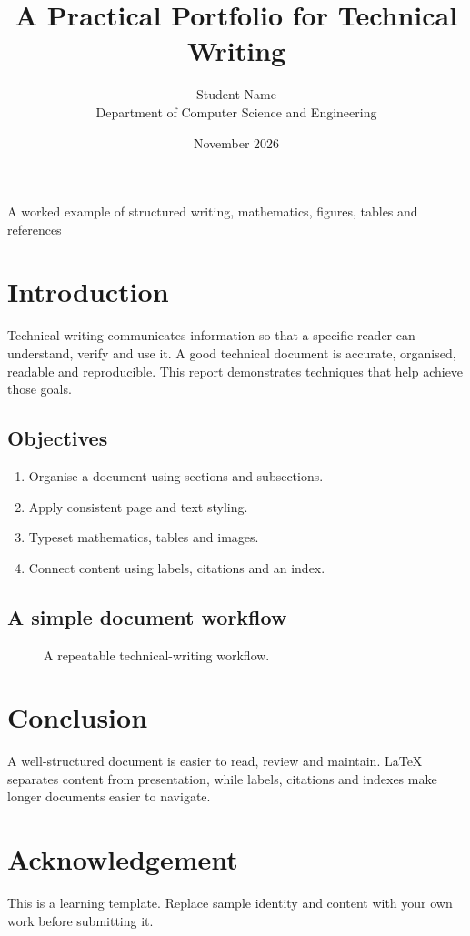 \documentclass[11pt,a4paper]{article}
\title{A Practical Portfolio for Technical Writing}
\author{Student Name \\ Department of Computer Science and Engineering}
\date{November 2026}
\begin{document}
\maketitle
\begin{center}\color{Muted}\small A worked example of structured writing, mathematics, figures, tables and references\end{center}
\tableofcontents
\listoffigures
\listoftables
\newpage
\section{Introduction}\label{sec:introduction}
Technical writing communicates information so that a specific reader can understand, verify and use it. A good technical document is accurate, organised, readable and reproducible. This report demonstrates techniques that help achieve those goals.
\subsection{Objectives}
\begin{enumerate}
\item Organise a document using sections and subsections.
\item Apply consistent page and text styling.
\item Typeset mathematics, tables and images.
\item Connect content using labels, citations and an index.
\end{enumerate}
\subsection{A simple document workflow}
\begin{figure}[H]\centering
{}
\caption{A repeatable technical-writing workflow.}\label{fig:workflow}
\end{figure}



\section{Conclusion}\label{sec:conclusion}
A well-structured document is easier to read, review and maintain. LaTeX separates content from presentation, while labels, citations and indexes make longer documents easier to navigate.
\section*{Acknowledgement}
This is a learning template. Replace sample identity and content with your own work before submitting it.


\printindex
\end{document}
